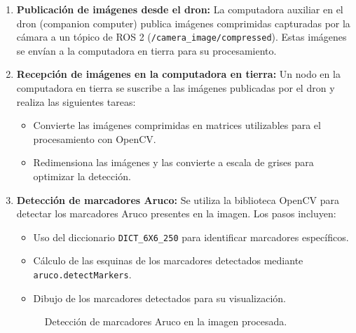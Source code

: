     \begin{enumerate}
        \item \textbf{Publicación de imágenes desde el dron:} 
        La computadora auxiliar en el dron (companion computer) publica imágenes comprimidas capturadas por la cámara a un tópico de ROS 2 (\texttt{/camera\_image/compressed}). Estas imágenes se envían a la computadora en tierra para su procesamiento.
    
        \item \textbf{Recepción de imágenes en la computadora en tierra:} 
        Un nodo en la computadora en tierra se suscribe a las imágenes publicadas por el dron y realiza las siguientes tareas:
        \begin{itemize}
            \item Convierte las imágenes comprimidas en matrices utilizables para el procesamiento con OpenCV.
            \item Redimensiona las imágenes y las convierte a escala de grises para optimizar la detección.
        \end{itemize}
    
        \item \textbf{Detección de marcadores Aruco:} 
        Se utiliza la biblioteca OpenCV para detectar los marcadores Aruco presentes en la imagen. Los pasos incluyen:
        \begin{itemize}
            \item Uso del diccionario \texttt{DICT\_6X6\_250} para identificar marcadores específicos.
            \item Cálculo de las esquinas de los marcadores detectados mediante \texttt{aruco.detectMarkers}.
            \item Dibujo de los marcadores detectados para su visualización.
        \end{itemize}
        \begin{center}
            \begin{figure}[h!]
                \centering
                \caption{Detección de marcadores Aruco en la imagen procesada.}
            \end{figure}
        \end{center}
    

\end{enumerate}
